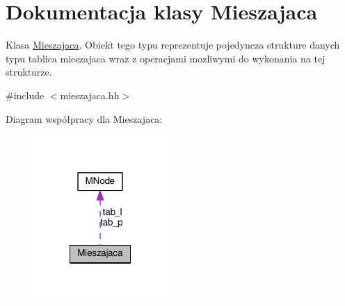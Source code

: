 \hypertarget{class_mieszajaca}{\section{Dokumentacja klasy Mieszajaca}
\label{class_mieszajaca}
}


Klasa \hyperlink{class_mieszajaca}{Mieszajaca}. Obiekt tego typu reprezentuje pojedyncza strukture danych typu tablica mieszajaca wraz z operacjami mozliwymi do wykonania na tej strukturze.  




{\ttfamily \#include $<$mieszajaca.\-hh$>$}



Diagram współpracy dla Mieszajaca\-:
\nopagebreak
\begin{figure}[H]
\begin{center}
\leavevmode
\includegraphics[width=144pt]{class_mieszajaca__coll__graph}
\end{center}
\end{figure}
